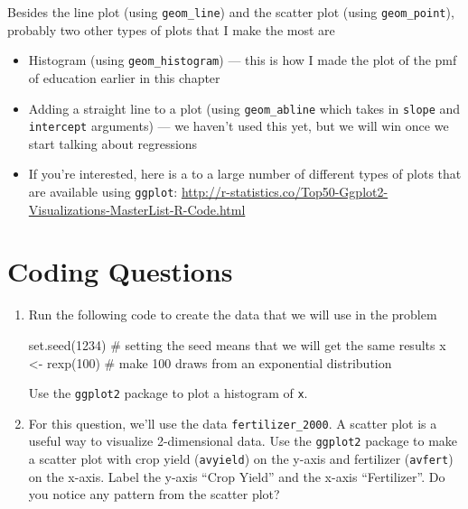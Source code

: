 \documentclass[
  letterpaper,
  DIV=11,
  numbers=noendperiod]{scrreprt}
\newenvironment{Shaded}{\begin{snugshade}}{\end{snugshade}}
\newcommand{\CommentTok}[1]{\textcolor[rgb]{0.37,0.37,0.37}{#1}}
\newcommand{\DecValTok}[1]{\textcolor[rgb]{0.68,0.00,0.00}{#1}}
\newcommand{\FunctionTok}[1]{\textcolor[rgb]{0.28,0.35,0.67}{#1}}
\newcommand{\NormalTok}[1]{\textcolor[rgb]{0.00,0.23,0.31}{#1}}
\newcommand{\OtherTok}[1]{\textcolor[rgb]{0.00,0.23,0.31}{#1}}
\begin{document}
Besides the line plot (using \texttt{geom\_line}) and the scatter plot
(using \texttt{geom\_point}), probably two other types of plots that I
make the most are

\begin{itemize}
\item
  Histogram (using \texttt{geom\_histogram}) --- this is how I made the
  plot of the pmf of education earlier in this chapter
\item
  Adding a straight line to a plot (using \texttt{geom\_abline} which
  takes in \texttt{slope} and \texttt{intercept} arguments) --- we
  haven't used this yet, but we will win once we start talking about
  regressions
\item
  If you're interested, here is a to a large number of different types
  of plots that are available using \texttt{ggplot}:
  \url{http://r-statistics.co/Top50-Ggplot2-Visualizations-MasterList-R-Code.html}
\end{itemize}

\section{Coding Questions}\label{coding-questions}

\begin{enumerate}
\def\labelenumi{\arabic{enumi}.}
\item
  Run the following code to create the data that we will use in the
  problem

\begin{Shaded}
\begin{Highlighting}[]
\FunctionTok{set.seed}\NormalTok{(}\DecValTok{1234}\NormalTok{) }\CommentTok{\# setting the seed means that we will get the same results}
\NormalTok{x }\OtherTok{\textless{}{-}} \FunctionTok{rexp}\NormalTok{(}\DecValTok{100}\NormalTok{) }\CommentTok{\# make 100 draws from an exponential distribution}
\end{Highlighting}
\end{Shaded}

  Use the \texttt{ggplot2} package to plot a histogram of \texttt{x}.
\item
  For this question, we'll use the data \texttt{fertilizer\_2000}. A
  scatter plot is a useful way to visualize 2-dimensional data. Use the
  \texttt{ggplot2} package to make a scatter plot with crop yield
  (\texttt{avyield}) on the y-axis and fertilizer (\texttt{avfert}) on
  the x-axis. Label the y-axis ``Crop Yield'' and the x-axis
  ``Fertilizer''. Do you notice any pattern from the scatter plot?
\end{enumerate}
\end{document}
